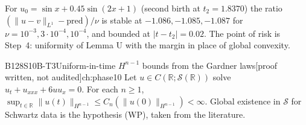 \documentclass[11pt,a4paper,oneside]{report}
\newcommand{\badge}[2]{\textcolor{#1}{\textsf{\footnotesize[#2]}}}
\newcommand{\pw}{\badge{cD}{proof written, not audited}}
\newcommand{\R}{\mathbb{R}}\newcommand{\C}{\mathbb{C}}\newcommand{\N}{\mathbb{N}}\newcommand{\Z}{\mathbb{Z}}\newcommand{\Q}{\mathbb{Q}}
\newenvironment{dimcard}[5]{\par\Needspace{12\baselineskip}\begin{dimcardbox}{#1}{#2}{#3}{#4}{#5}}{\end{dimcardbox}}
\begin{document}
\begin{caution}[title=Checked on an example]
For $u_0=\sin x+0.45\sin(2x+1)$ (second birth at $t_2=1.8370$) the ratio $(\|u-v\|_{L^1}-\text{pred})/\nu$ is stable at $-1.086,-1.085,-1.087$ for $\nu=10^{-3},3\cdot10^{-4},10^{-4}$, and bounded at $|t-t_2|=0.02$. The point of risk is Step~4: uniformity of Lemma U with the margin in place of global convexity.
\end{caution}

\begin{dimcard}{B128}{S10B-T3}{Uniform-in-time $H^{n-1}$ bounds from the Gardner laws}{\pw}{ch:phase10}
Let $u\in C(\R;\mathcal S(\R))$ solve $u_t+u_{xxx}+6uu_x=0$. For each $n\ge1$, $\sup_{t\in\R}\|u(t)\|_{H^{n-1}}\le C_n(\|u(0)\|_{H^{n-1}})<\infty$. Global existence in $\mathcal S$ for Schwartz data is the hypothesis (WP), taken from the literature.
\end{dimcard}
\end{document}
